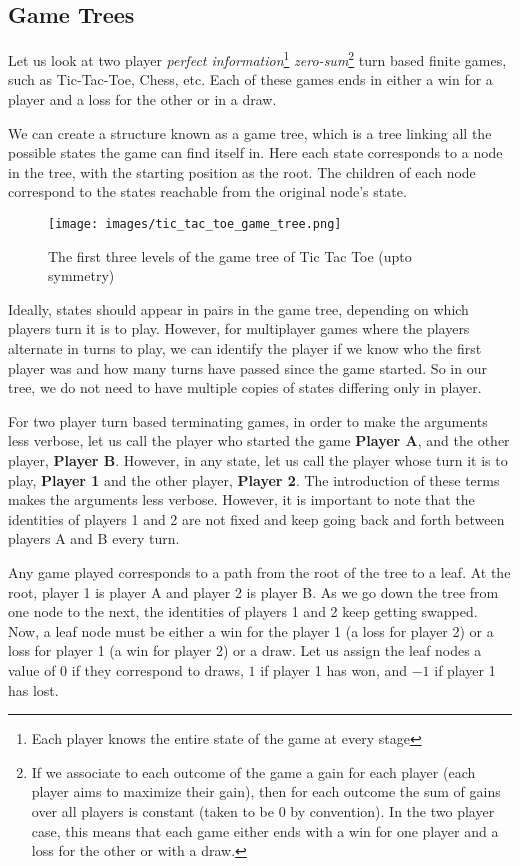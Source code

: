\documentclass[12pt]{report}
\begin{document}
\subsection{Game Trees}

Let us look at two player \textit{perfect information}\footnote{Each player knows the entire state of the game at every stage} \textit{zero-sum}\footnote{If we associate to each outcome of the game a gain for each player (each player aims to maximize their gain), then for each outcome the sum of gains over all players is constant (taken to be $0$ by convention). In the two player case, this means that each game either ends with a win for one player and a loss for the other or with a draw.} turn based finite games, such as Tic-Tac-Toe, Chess, etc. Each of these games ends in either a win for a player and a loss for the other or in a draw.

We can create a structure known as a game tree, which is a tree linking all the possible states the game can find itself in.
Here each state corresponds to a node in the tree, with the starting position as the root. The children of each node correspond to the states reachable from the original node's state.
\begin{figure}[H]
    \centering
    \texttt{[image: images/tic\_tac\_toe\_game\_tree.png]}
    \caption{The first three levels of the game tree of Tic Tac Toe (upto symmetry)}
\end{figure}

Ideally, states should appear in pairs in the game tree, depending on which players turn it is to play. However, for multiplayer games where the players alternate in turns to play, we
can identify the player if we know who the first player was and how many turns have passed since the game started. So in our tree, we do not need to have multiple copies of states differing only in player.

For two player turn based terminating games, in order to make the arguments less verbose, let us call the player who started the game \textbf{Player A}, and the other player, \textbf{Player B}.
However, in any state, let us call the player whose turn it is to play, \textbf{Player 1} and the other player, \textbf{Player 2}. The introduction of these terms makes the arguments less verbose.
However, it is important to note that the identities of players 1 and 2 are not fixed and keep going back and forth between players A and B every turn.

Any game played corresponds to a path from the root of the tree to a leaf. At the root, player 1 is player A and player 2 is player B. As we go down the tree from one node to the next, the identities of players 1 and 2 keep getting swapped.
Now, a leaf node must be either a win for the player 1 (a loss for player 2) or a loss for player 1 (a win for player 2) or a draw.
Let us assign the leaf nodes a value of $0$ if they correspond to draws, $1$ if player 1 has won, and $-1$ if player 1 has lost. 
\end{document}
